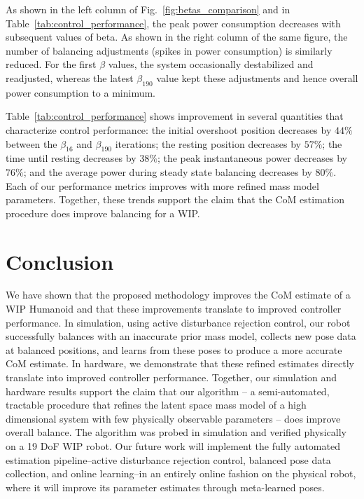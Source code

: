 \documentclass[letterpaper, 10 pt, conference]{ieeeconf}
\begin{document}
As shown in the left column of Fig.~\ref{fig:betas_comparison} and in
Table~\ref{tab:control_performance}, the peak power consumption decreases with
subsequent values of beta.  As shown in the right column of the same figure, the
number of balancing adjustments (spikes in power consumption) is similarly
reduced.  For the first $\beta$ values, the system occasionally destabilized and
readjusted, whereas the latest $\beta_{190}$ value kept these adjustments and
hence overall power consumption to a minimum.

Table~\ref{tab:control_performance} shows improvement in several quantities that
characterize control performance: the initial overshoot position decreases by
$44\%$ between the $\beta_{16}$ and $\beta_{190}$ iterations; the resting
position decreases by $57\%$; the time until resting decreases by $38\%$; the
peak instantaneous power decreases by $76\%$; and the average power during
steady state balancing decreases by $80\%$.  Each of our performance metrics
improves with more refined mass model parameters.  Together, these trends
support the claim that the \ac{CoM} estimation procedure does improve balancing
for a \ac{WIP}.


\section{Conclusion}
\label{sec:conclusion}
We have shown that the proposed methodology improves the \ac{CoM} estimate of a
\ac{WIP} Humanoid and that these improvements translate to improved controller
performance.
In simulation, using active disturbance rejection control, our robot
successfully balances with an inaccurate prior mass model, collects new pose
data at balanced positions, and learns from these poses to produce a more
accurate \ac{CoM} estimate.
In hardware, we demonstrate that these refined estimates directly translate into
improved controller performance.
Together, our simulation and hardware results support the claim that our
algorithm -- a semi-automated, tractable procedure that refines the latent space
mass model of a high dimensional system with few physically observable
parameters -- does improve overall balance.  The algorithm was probed in
simulation and verified physically on a 19 \ac{DoF} \ac{WIP} robot.
Our future work will implement the fully automated estimation pipeline--active
disturbance rejection control, balanced pose data collection, and online
learning--in an entirely online fashion on the physical robot, where it will
improve its parameter estimates through meta-learned poses.
\end{document}

